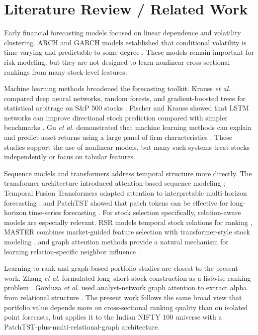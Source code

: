 \documentclass[conference]{IEEEtran}
\begin{document}
\section{Literature Review / Related Work}
Early financial forecasting models focused on linear dependence and volatility clustering. ARCH and GARCH models established that conditional volatility is time-varying and predictable to some degree \cite{engle1982autoregressive,bollerslev1986generalized}. These models remain important for risk modeling, but they are not designed to learn nonlinear cross-sectional rankings from many stock-level features.

Machine learning methods broadened the forecasting toolkit. Krauss \emph{et al.} compared deep neural networks, random forests, and gradient-boosted trees for statistical arbitrage on S\&P 500 stocks \cite{krauss2017deep}. Fischer and Krauss showed that LSTM networks can improve directional stock prediction compared with simpler benchmarks \cite{fischer2018deep}. Gu \emph{et al.} demonstrated that machine learning methods can explain and predict asset returns using a large panel of firm characteristics \cite{gu2020empirical}. These studies support the use of nonlinear models, but many such systems treat stocks independently or focus on tabular features.

Sequence models and transformers address temporal structure more directly. The transformer architecture introduced attention-based sequence modeling \cite{vaswani2017attention}; Temporal Fusion Transformers adapted attention to interpretable multi-horizon forecasting \cite{lim2021temporal}; and PatchTST showed that patch tokens can be effective for long-horizon time-series forecasting \cite{nie2023patchtst}. For stock selection specifically, relation-aware models are especially relevant. RSR models temporal stock relations for ranking \cite{feng2019temporal}, MASTER combines market-guided feature selection with transformer-style stock modeling \cite{li2024master}, and graph attention methods provide a natural mechanism for learning relation-specific neighbor influence \cite{velickovic2018gat,kipf2017semi}.

Learning-to-rank and graph-based portfolio studies are closest to the present work. Zhang \emph{et al.} formulated long--short stock construction as a listwise ranking problem \cite{zhang2022listwise}. Gorduza \emph{et al.} used analyst-network graph attention to extract alpha from relational structure \cite{gorduza2024analyst}. The present work follows the same broad view that portfolio value depends more on cross-sectional ranking quality than on isolated point forecasts, but applies it to the Indian NIFTY 100 universe with a PatchTST-plus-multi-relational-graph architecture.
\end{document}
